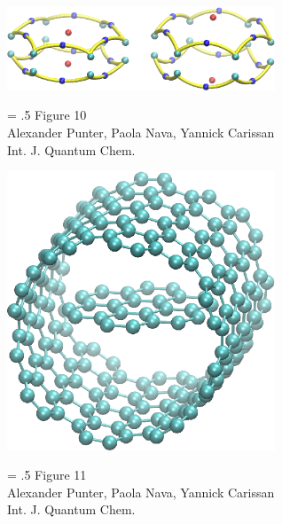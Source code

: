 \documentclass[12pt]{article}
\begin{document}
\begin{figure}
\begin{center}
\includegraphics[width=8cm]{aim_c6h6.eps}
\end{center}
{\Large
\begin{minipage}[t]{3in}
\baselineskip = .5\baselineskip
Figure 10 \\
Alexander Punter, Paola Nava, Yannick Carissan\\
Int. J. Quantum Chem.
\end{minipage}
}
\end{figure}

\clearpage

\begin{figure}
\begin{center}
\includegraphics[width=8cm]{nanotube_model_crop.eps}
\end{center}
{\Large
\begin{minipage}[t]{3in}
\baselineskip = .5\baselineskip
Figure 11 \\
Alexander Punter, Paola Nava, Yannick Carissan\\
Int. J. Quantum Chem.
\end{minipage}
}
\end{figure}

\clearpage
\end{document}
